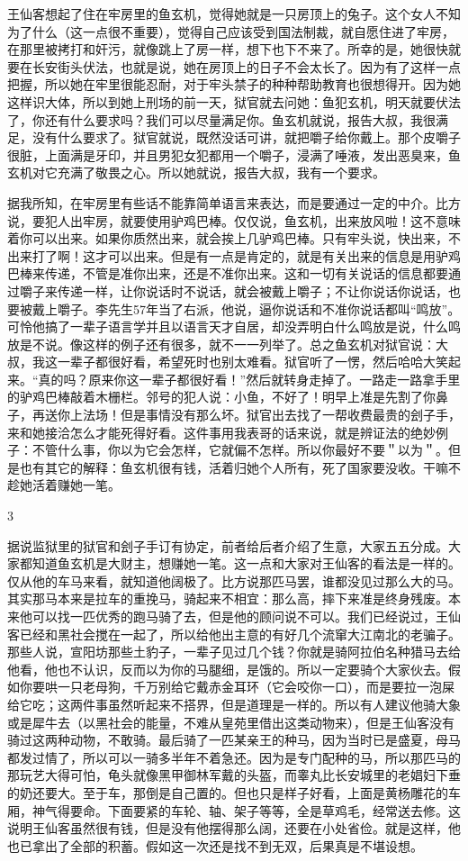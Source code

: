 王仙客想起了住在牢房里的鱼玄机，觉得她就是一只房顶上的兔子。这个女人不知为了什么（这一点很不重要），觉得自己应该受到国法制裁，就自愿住进了牢房，在那里被拷打和奸污，就像跳上了房一样，想下也下不来了。所幸的是，她很快就要在长安街头伏法，也就是说，她在房顶上的日子不会太长了。因为有了这样一点把握，所以她在牢里很能忍耐，对于牢头禁子的种种帮助教育也很想得开。因为她这样识大体，所以到她上刑场的前一天，狱官就去问她：鱼犯玄机，明天就要伏法了，你还有什么要求吗？我们可以尽量满足你。鱼玄机就说，报告大叔，我很满足，没有什么要求了。狱官就说，既然没话可讲，就把嚼子给你戴上。那个皮嚼子很脏，上面满是牙印，并且男犯女犯都用一个嚼子，浸满了唾液，发出恶臭来，鱼玄机对它充满了敬畏之心。所以她就说，报告大叔，我有一个要求。 

据我所知，在牢房里有些话不能靠简单语言来表达，而是要通过一定的中介。比方说，要犯人出牢房，就要使用驴鸡巴棒。仅仅说，鱼玄机，出来放风啦！这不意味着你可以出来。如果你质然出来，就会挨上几驴鸡巴棒。只有牢头说，快出来，不出来打了啊！这才可以出来。但是有一点是肯定的，就是有关出来的信息是用驴鸡巴棒来传递，不管是准你出来，还是不准你出来。这和一切有关说话的信息都要通过嚼子来传递一样，让你说话时不说话，就会被戴上嚼子；不让你说话你说话，也要被戴上嚼子。李先生57年当了右派，他说，逼你说话和不准你说话都叫“鸣放”。可怜他搞了一辈子语言学并且以语言天才自居，却没弄明白什么鸣放是说，什么鸣放是不说。像这样的例子还有很多，就不一一列举了。总之鱼玄机对狱官说：大叔，我这一辈子都很好看，希望死时也别太难看。狱官听了一愣，然后哈哈大笑起来。“真的吗？原来你这一辈子都很好看！”然后就转身走掉了。一路走一路拿手里的驴鸡巴棒敲着木栅栏。邻号的犯人说：小鱼，不好了！明早上准是先割了你鼻子，再送你上法场！但是事情没有那么坏。狱官出去找了一帮收费最贵的刽子手，来和她接洽怎么才能死得好看。这件事用我表哥的话来说，就是辨证法的绝妙例子：不管什么事，你以为它会怎样，它就偏不怎样。所以你最好不要＂以为＂。但是也有其它的解释：鱼玄机很有钱，活着归她个人所有，死了国家要没收。干嘛不趁她活着赚她一笔。 

3 

据说监狱里的狱官和刽子手订有协定，前者给后者介绍了生意，大家五五分成。大家都知道鱼玄机是大财主，想赚她一笔。这一点和大家对王仙客的看法是一样的。仅从他的车马来看，就知道他阔极了。比方说那匹马罢，谁都没见过那么大的马。其实那马本来是拉车的重挽马，骑起来不相宜：那么高，摔下来准是终身残废。本来他可以找一匹优秀的跑马骑了去，但是他的顾问说不可以。我们已经说过，王仙客已经和黑社会搅在一起了，所以给他出主意的有好几个流窜大江南北的老骗子。那些人说，宣阳坊那些土豹子，一辈子见过几个钱？你就是骑阿拉伯名种猎马去给他看，他也不认识，反而以为你的马腿细，是饿的。所以一定要骑个大家伙去。假如你要哄一只老母狗，千万别给它戴赤金耳环（它会咬你一口），而是要拉一泡屎给它吃；这两件事虽然听起来不搭界，但是道理是一样的。所以有人建议他骑大象或是犀牛去（以黑社会的能量，不难从皇苑里借出这类动物来），但是王仙客没有骑过这两种动物，不敢骑。最后骑了一匹某亲王的种马，因为当时已是盛夏，母马都发过情了，所以可以一骑多半年不着急还。因为是专门配种的马，所以那匹马的那玩艺大得可怕，龟头就像黑甲御林军戴的头盔，而睾丸比长安城里的老娼妇下垂的奶还要大。至于车，那倒是自己置的。但也只是样子好看，上面是黄杨雕花的车厢，神气得要命。下面要紧的车轮、轴、架子等等，全是草鸡毛，经常送去修。这说明王仙客虽然很有钱，但是没有他摆得那么阔，还要在小处省俭。就是这样，他也已拿出了全部的积蓄。假如这一次还是找不到无双，后果真是不堪设想。 

